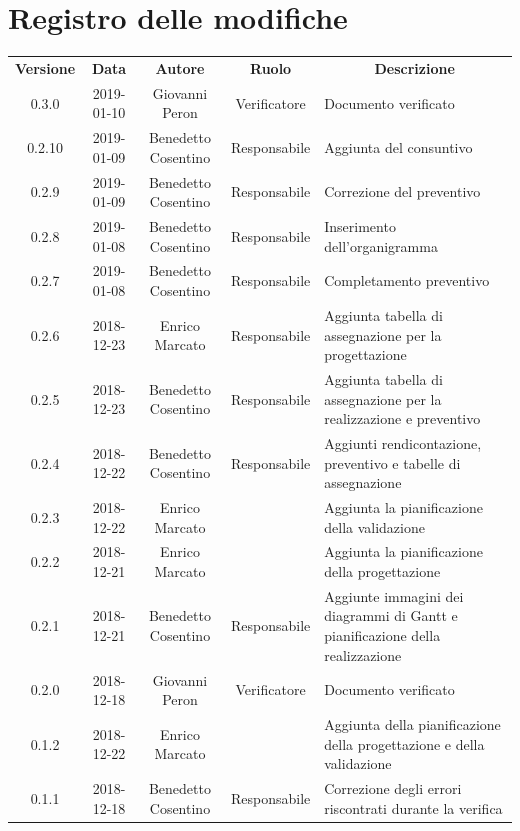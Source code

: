\documentclass[11pt,a4paper]{article}
\begin{document}
	
	
	\newpage
	\section*{\centering Registro delle modifiche}
	\begin{tabularx}{\textwidth}{ c | c | c | c | X }
		\rowcolor{LightBlue}
		\color{white}\bfseries Versione & 
		\color{white}\bfseries Data & 
		\color{white}\bfseries Autore & 
		\color{white}\bfseries Ruolo & 
		\multicolumn{1}{c}{\color{white}\bfseries Descrizione}\\[0.25cm]
		0.3.0 & 2019-01-10 & Giovanni Peron & Verificatore & Documento verificato\\ \hline
		0.2.10 & 2019-01-09 & Benedetto Cosentino & Responsabile & Aggiunta del consuntivo\\ \hline
		0.2.9 & 2019-01-09 & Benedetto Cosentino & Responsabile & Correzione del preventivo\\ \hline
		0.2.8 & 2019-01-08 & Benedetto Cosentino & Responsabile & Inserimento dell'organigramma \\ \hline
		0.2.7 & 2019-01-08 & Benedetto Cosentino & Responsabile & Completamento preventivo \\ \hline	
		0.2.6 & 2018-12-23 & Enrico Marcato & Responsabile & Aggiunta tabella di assegnazione per la progettazione\\ \hline
		0.2.5 & 2018-12-23 & Benedetto Cosentino & Responsabile & Aggiunta tabella di assegnazione per la realizzazione e preventivo\\ \hline
		0.2.4 & 2018-12-22 & Benedetto Cosentino & Responsabile & Aggiunti rendicontazione, preventivo e tabelle di assegnazione \\ \hline
		0.2.3 & 2018-12-22 & Enrico Marcato &  & Aggiunta la pianificazione della validazione\\ \hline
		0.2.2 & 2018-12-21 & Enrico Marcato &  & Aggiunta la pianificazione della progettazione\\ \hline
		0.2.1 & 2018-12-21 & Benedetto Cosentino & Responsabile & Aggiunte immagini dei diagrammi di Gantt e pianificazione della realizzazione\\ \hline
		0.2.0 & 2018-12-18 & Giovanni Peron & Verificatore & Documento verificato\\ \hline
		0.1.2 & 2018-12-22 & Enrico Marcato &  & Aggiunta della pianificazione della progettazione e della validazione\\ \hline
		0.1.1 & 2018-12-18 & Benedetto Cosentino & Responsabile & Correzione degli errori riscontrati durante la verifica\\ \hline

\end{tabularx}
\end{document}
